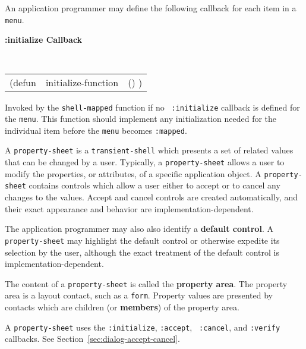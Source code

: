 
An application programmer may define the following callback for
each item in a {\tt menu}.

{\samepage
{\large {\bf :initialize \hfill Callback}} 
\begin{flushright} 
\parbox[t]{6.125in}{
\tt
\begin{tabular}{lll}
\raggedright
(defun & initialize-function & () )
\end{tabular}
\rm

}\end{flushright}}

\begin{flushright} \parbox[t]{6.125in}{
Invoked by the {\tt shell-mapped} function if no {\tt
:initialize} callback is defined for the {\tt menu}.
This function should implement any initialization needed for the individual
item before the {\tt menu} becomes {\tt :mapped}.

}\end{flushright}


\vfill
\pagebreak
{}                                      

A {\tt property-sheet} is a {\tt transient-shell} which presents a set of
related values that can be changed
by a user.  Typically, a
{\tt property-sheet} allows a user to modify the properties, or attributes, of a
specific application object. A {\tt property-sheet} contains controls which
allow a user either to accept or to cancel any changes to the values. Accept
and cancel controls are created automatically, and their exact appearance and
behavior are implementation-dependent.

The application programmer may also also identify a {\bf default
control}. A {\tt property-sheet} may highlight the
default control or otherwise expedite its selection by the user, although the
exact treatment of the default control is implementation-dependent.


The content of a {\tt property-sheet} is called the {\bf property area}.
 The property area is a layout
contact, such as a {\tt form}.  Property values are
presented by contacts which are children (or {\bf members})
 of the property area.

A {\tt property-sheet} uses the {\tt :initialize}, {\tt :accept}, {\tt
:cancel}, and {\tt :verify} callbacks.  See
Section~\ref{sec:dialog-accept-cancel}.




